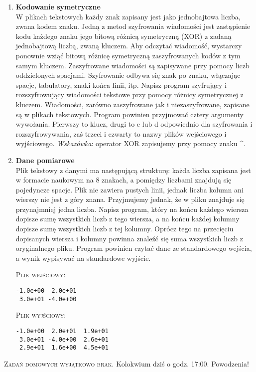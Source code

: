\documentclass[12pt]{article}
\begin{document}
\begin{enumerate}
\newpage

\item \textbf{Kodowanie symetryczne}\\
W plikach tekstowych każdy znak zapisany jest jako jednobajtowa liczba, zwana kodem znaku.
Jedną z metod szyfrowania wiadomości jest zastąpienie kodu każdego znaku jego bitową różnicą symetryczną
(\textsc{XOR}) z zadaną jednobajtową liczbą, zwaną kluczem. Aby odczytać wiadomość,
wystarczy ponownie wziąć bitową różnicę symetryczną zaszyfrowanych kodów z tym samym kluczem.
Zaszyfrowane wiadomości są zapisywane przy pomocy liczb oddzielonych spacjami. Szyfrowanie odbywa się znak po znaku, włączając spacje, tabulatory, znaki końca linii, itp.
Napisz program szyfrujący i rozszyfrowujący wiadomości tekstowe przy pomocy różnicy symetrycznej
z kluczem. Wiadomości, zarówno zaszyfrowane jak i niezaszyfrowane, zapisane są w plikach tekstowych. Program
powinien przyjmować cztery argumenty wywołania. Pierwszy to klucz, drugi to \textsf{e} lub \textsf{d} odpowiednio
dla szyfrowania i rozszyfrowywania, zaś trzeci i czwarty to nazwy plików wejściowego i wyjściowego.
\textit{Wskazówka}: operator \textsc{XOR} zapisujemy przy pomocy znaku \textsf{\^{}}.

\item \textbf{Dane pomiarowe}\\
Plik tekstowy z danymi ma następującą strukturę: każda liczba zapisana jest w formacie naukowym na 8 znakach, a pomiędzy liczbami znajdują się pojedyncze spacje. Plik nie zawiera pustych linii, jednak liczba kolumn ani wierszy nie jest z góry znana. Przyjmujemy jednak, że w pliku znajduje się przynajmniej jedna liczba. Napisz program, który na końcu każdego wiersza dopisze sumę wszystkich liczb z tego wiersza, a na końcu każdej kolumny dopisze sumę wszystkich liczb z tej kolumny. Oprócz tego na przecięciu dopisanych wiersza i kolumny powinna znaleźć się suma wszystkich liczb z oryginalnego pliku. Program powinien czytać dane ze standardowego wejścia, a wynik wypisywać na standardowe wyjście.
\begin{multicols}{2}
\textsc{Plik wejściowy:}
\begin{verbatim}
-1.0e+00  2.0e+01
 3.0e+01 -4.0e+00

\end{verbatim}
\textsc{Plik wyjściowy:}
\begin{verbatim}
-1.0e+00  2.0e+01  1.9e+01
 3.0e+01 -4.0e+00  2.6e+01
 2.9e+01  1.6e+00  4.5e+01
\end{verbatim}
\end{multicols}

\end{enumerate}

\vspace{0.3cm}
\small \textsc{Zadań domowych wyjątkowo brak.} Kolokwium dziś o godz. 17:00. Powodzenia!
\end{document}
